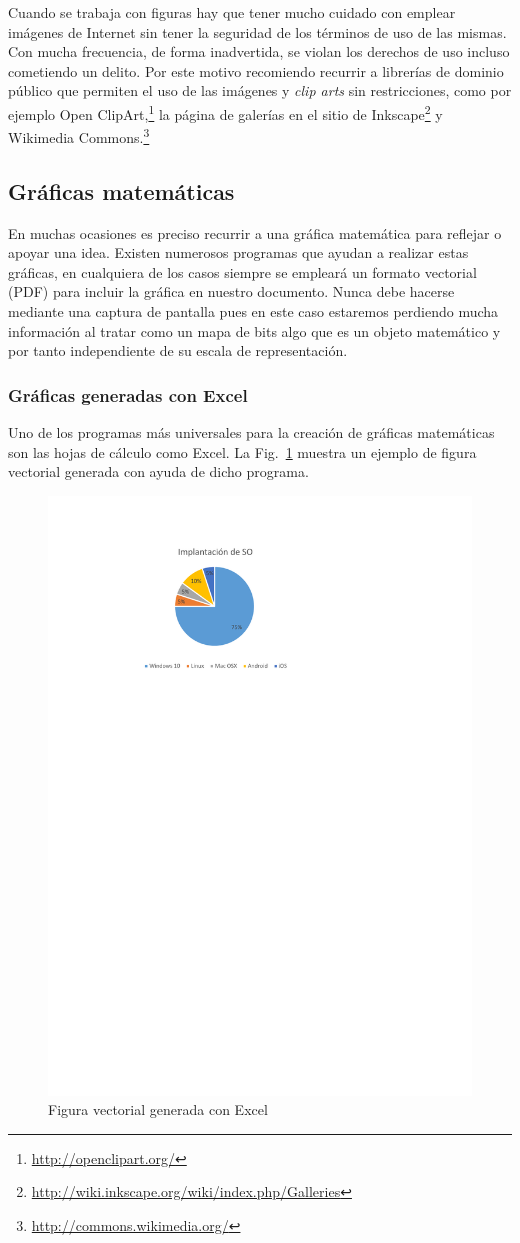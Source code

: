 \documentclass[11pt,a4paper]{article}
\begin{document}
Cuando se trabaja con figuras hay que tener mucho cuidado con emplear imágenes de Internet sin tener la seguridad de los términos de uso de las mismas. Con mucha frecuencia, de forma inadvertida, se violan los derechos de uso incluso cometiendo un delito. Por este motivo recomiendo recurrir a librerías de dominio público que permiten el uso de las imágenes y \emph{clip arts} sin restricciones, como por ejemplo Open ClipArt,\footnote{\url{http://openclipart.org/}} la página de galerías en el sitio de Inkscape\footnote{\url{http://wiki.inkscape.org/wiki/index.php/Galleries}} y Wikimedia Commons.\footnote{\url{http://commons.wikimedia.org/}}



\newpage
\subsection{Gráficas matemáticas}
En muchas ocasiones es preciso recurrir a una gráfica matemática para reflejar o apoyar una idea. Existen numerosos programas que ayudan a realizar estas gráficas, en cualquiera de los casos siempre se empleará un formato vectorial (PDF) para incluir la gráfica en nuestro documento. Nunca debe hacerse mediante una captura de pantalla pues en este caso estaremos perdiendo mucha información al tratar como un mapa de bits algo que es un objeto matemático y por tanto independiente de su escala de representación.

\subsubsection{Gráficas generadas con Excel}
Uno de los programas más universales para la creación de gráficas matemáticas son las hojas de cálculo como Excel. La Fig.~\ref{fig:excel} muestra un ejemplo de figura vectorial generada con ayuda de dicho programa.

\begin{figure}[hbt]
	\centering
	\includegraphics[width=0.5\linewidth]{EjFigsExcelOrig} 
	\caption[Gráfico de Excel]{Figura vectorial generada con Excel}
	\label{fig:excel}
\end{figure}
\end{document}
